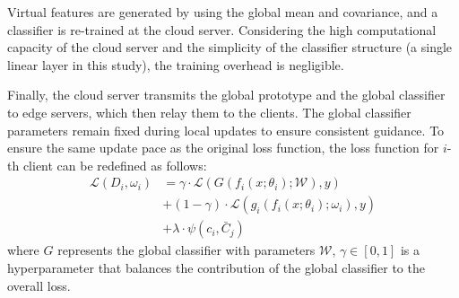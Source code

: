 \documentclass[journal]{IEEEtran}
\begin{document}
Virtual features are generated by using the global mean and covariance, and a classifier is re-trained at the cloud server. Considering the high computational capacity of the cloud server and the simplicity of the classifier structure (a single linear layer in this study), the training overhead is negligible.  

Finally, the cloud server transmits the global prototype and the global classifier to edge servers, which then relay them to the clients. The global classifier parameters remain fixed during local updates to ensure consistent guidance. To ensure the same update pace as the original loss function, the loss function for $i$-th client can be redefined as follows:
\begin{align}
  \label{SAE loss function}
  \mathcal{L}(D_i,\omega_i) &= \gamma \cdot \mathcal{L}(G(f_i(x;\theta_i); \mathcal{W}), y) \nonumber\\ 
  &+ (1-\gamma)\cdot \mathcal{L}(g_i(f_i(x;\theta_i); \omega_i), y)  \nonumber \\ 
  &+ \lambda \cdot \psi(c_{i}, \bar{C}_j)
\end{align}
where $G$ represents the global classifier with parameters $\mathcal{W}$, $\gamma \in [0,1]$ is a hyperparameter that balances the contribution of the global classifier to the overall loss. 


\end{document}

